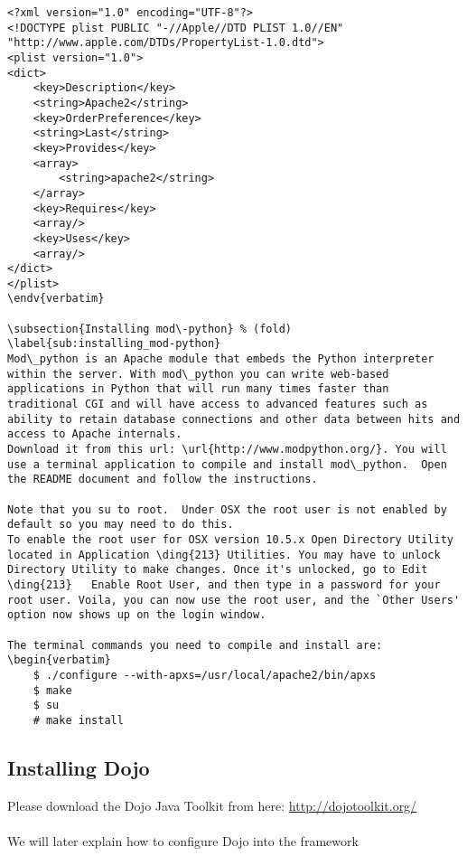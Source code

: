 \begin{verbatim}
<?xml version="1.0" encoding="UTF-8"?>
<!DOCTYPE plist PUBLIC "-//Apple//DTD PLIST 1.0//EN" "http://www.apple.com/DTDs/PropertyList-1.0.dtd">
<plist version="1.0">
<dict>
	<key>Description</key>
	<string>Apache2</string>
	<key>OrderPreference</key>
	<string>Last</string>
	<key>Provides</key>
	<array>
		<string>apache2</string>
	</array>
	<key>Requires</key>
	<array/>
	<key>Uses</key>
	<array/>
</dict>
</plist>
\endv{verbatim}

\subsection{Installing mod\-python} % (fold)
\label{sub:installing_mod-python}
Mod\_python is an Apache module that embeds the Python interpreter within the server. With mod\_python you can write web-based applications in Python that will run many times faster than traditional CGI and will have access to advanced features such as ability to retain database connections and other data between hits and access to Apache internals.
Download it from this url: \url{http://www.modpython.org/}. You will use a terminal application to compile and install mod\_python.  Open the README document and follow the instructions.  

Note that you su to root.  Under OSX the root user is not enabled by default so you may need to do this.  
To enable the root user for OSX version 10.5.x Open Directory Utility located in Application \ding{213} Utilities. You may have to unlock Directory Utility to make changes. Once it's unlocked, go to Edit \ding{213}   Enable Root User, and then type in a password for your root user. Voila, you can now use the root user, and the `Other Users' option now shows up on the login window.

The terminal commands you need to compile and install are:
\begin{verbatim}
	$ ./configure --with-apxs=/usr/local/apache2/bin/apxs
	$ make
	$ su
	# make install
\end{verbatim}



\subsection{Installing Dojo} %
\label{sub:installing_dojo}
Please download the Dojo Java Toolkit from here: \url{http://dojotoolkit.org/}
\\
\\
\label{par:dojo Installation}
 We will later explain how to configure Dojo into the framework



























